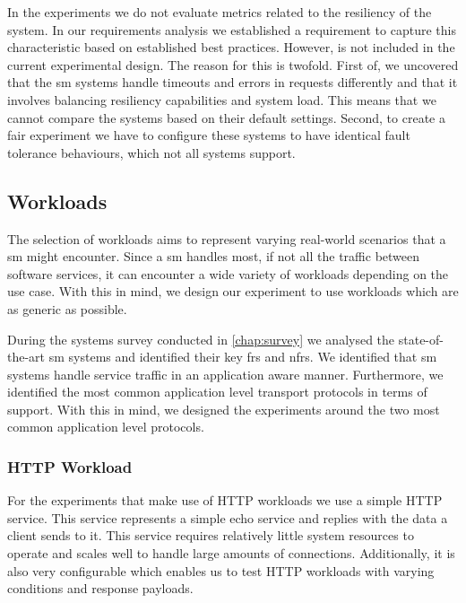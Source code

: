 In the experiments we do not evaluate metrics related to the resiliency of the system. In our requirements analysis we established a requirement to capture this characteristic based on established best practices. However, is not included in the current experimental design. The reason for this is twofold. First of, we uncovered that the \gls{sm} systems handle timeouts and errors in requests differently \cite{linkerd-retry} and that it involves balancing resiliency capabilities and system load. This means that we cannot compare the systems based on their default settings. Second, to create a fair experiment we have to configure these systems to have identical fault tolerance behaviours, which not all systems support. 


\subsection{Workloads}
\label{sec:experiments:design:workloads}

The selection of workloads aims to represent varying real-world scenarios that a \gls{sm} might encounter. Since a \gls{sm} handles most, if not all the traffic between software services, it can encounter a wide variety of workloads depending on the use case. With this in mind, we design our experiment to use workloads which are as generic as possible. 

During the systems survey conducted in \cref{chap:survey} we analysed the state-of-the-art \gls{sm} systems and identified their key \glspl{fr} and \glspl{nfr}. We identified that \gls{sm} systems handle service traffic in an application aware manner. Furthermore, we identified the most common application level transport protocols in terms of support. With this in mind, we designed the experiments around the two most common application level protocols. 

\subsubsection{HTTP Workload}
\label{sec:experiments:design:workloads:http}

For the experiments that make use of HTTP workloads we use a simple HTTP service. This service represents a simple echo service and replies with the data a client sends to it. This service requires relatively little system resources to operate and scales well to handle large amounts of connections. Additionally, it is also very configurable which enables us to test HTTP workloads with varying conditions and response payloads.

